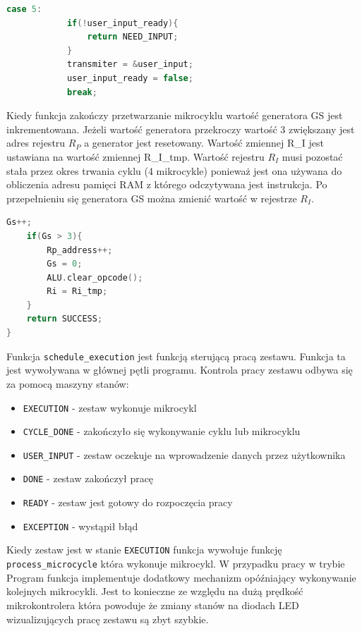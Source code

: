 \documentclass[../main.tex]{subfiles}
\begin{document}
\begin{lstlisting}[language=C++]
        case 5: 
            if(!user_input_ready){
                return NEED_INPUT;
            }
            transmiter = &user_input;
            user_input_ready = false;
            break;
\end{lstlisting}
\par
Kiedy funkcja zakończy przetwarzanie mikrocyklu wartość generatora GS jest inkrementowana. Jeżeli wartość generatora przekroczy wartość 3
zwiększany jest adres rejestru $R_P$ a generator jest resetowany. Wartość zmiennej R\_I jest ustawiana na wartość zmiennej R\_I\_tmp.
Wartość rejestru $R_I$ musi pozostać stała przez okres trwania cyklu (4 mikrocykle) ponieważ jest ona używana do obliczenia adresu pamięci RAM
z którego odczytywana jest instrukcja. Po przepełnieniu się generatora GS można zmienić wartość w rejestrze $R_I$.
 
\begin{lstlisting}[language=C++]
    Gs++;
    if(Gs > 3){
        Rp_address++;
        Gs = 0;
        ALU.clear_opcode();
        Ri = Ri_tmp;
    }
    return SUCCESS;
}
\end{lstlisting}

\par
Funkcja \texttt{schedule\_execution} jest funkcją sterującą pracą zestawu. Funkcja ta jest wywoływana w głównej pętli programu. 
Kontrola pracy zestawu odbywa się za pomocą maszyny stanów:

\begin{itemize}
    \item \texttt{EXECUTION} - zestaw wykonuje mikrocykl
    \item \texttt{CYCLE\_DONE} - zakończyło się wykonywanie cyklu lub mikrocyklu
    \item \texttt{USER\_INPUT} - zestaw oczekuje na wprowadzenie danych przez użytkownika
    \item \texttt{DONE} - zestaw zakończył pracę
    \item \texttt{READY} - zestaw jest gotowy do rozpoczęcia pracy
    \item \texttt{EXCEPTION} - wystąpił błąd
\end{itemize}

\par
Kiedy zestaw jest w stanie \texttt{EXECUTION} funkcja wywołuje funkcję \texttt{process\_microcycle} która wykonuje mikrocykl.
W przypadku pracy w trybie Program funkcja implementuje dodatkowy mechanizm opóźniający wykonywanie kolejnych mikrocykli.
Jest to konieczne ze względu na dużą prędkość mikrokontrolera która powoduje że zmiany stanów na diodach LED wizualizujących pracę 
zestawu są zbyt szybkie.
\end{document}
